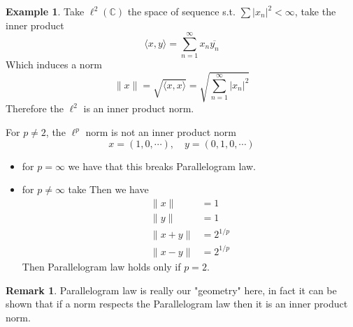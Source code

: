\documentclass[11pt,a4paper]{article}
\theoremstyle{definition}
\newtheorem{example}[definition]{Example}
\newtheorem{remark}[definition]{Remark}
\theoremstyle{plain}
\theoremstyle{remark}
\newcommand{\C}{\mathbb{C}}
\newcommand{\angles}[1]{\langle #1 \rangle}
\newcommand{\abs}[1]{\lvert #1 \rvert}
\newcommand{\norm}[1]{\lVert #1 \rVert}
\newcommand{\1}{\mathbbm{1}}
\begin{document}
\begin{example}
    Take $\ell^2(\C)$ the space of sequence s.t. $\sum \abs{x_n}^2 < \infty$, take the inner product 
    $$\angles{x, y} = \sum_{n=1}^\infty x_n \overline{y_n}$$
    Which induces a norm 
    $$\norm{x} = \sqrt{\angles{x, x}} = \sqrt{\sum_{n=1}^\infty \abs{x_n}^2}$$
    Therefore the $\ell^2$ is an inner product norm.    

    For $p \ne 2$, the $\ell^p$ norm is not an inner product norm
    $$x = (1, 0, \cdots), \quad y = (0,1, 0, \cdots)$$

    \begin{itemize}
        \item for $p = \infty$ we have that this breaks Parallelogram law.

        \item for $p \ne \infty$ take 
        Then we have
        \begin{align*}
            \norm{x} &= 1 \\
            \norm{y} &= 1 \\
            \norm{x+y} &= 2^{1/p} \\
            \norm{x-y} &= 2^{1/p}
        \end{align*}
        Then Parallelogram law holds only if $p = 2$.
    \end{itemize}
\end{example}

\begin{remark}
    Parallelogram law is really our "geometry" here, in fact it can be shown that if a norm respects the Parallelogram law then it is an inner product norm.
\end{remark}
\end{document}
